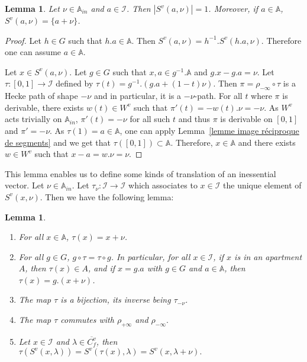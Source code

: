 \documentclass[12pt]{article}
\theoremstyle{plain}
\newtheorem{lemma}[theorem]{Lemma}
\theoremstyle{definition}
\newcommand{\A}{\mathbb{A}}
\newcommand{\I}{\mathcal{I}}
\begin{document}
\begin{lemma}\label{lemme partie inessentielle}
 Let $\nu\in\A_{in}$ and $a\in \I$. Then $|S^v(a,\nu)|=1$. Moreover, if $a\in \A$, $S^v(a,\nu)=\{a+\nu\}$. 

\end{lemma} 

\begin{proof} Let $h\in G$ such that $h.a\in \A$. Then $S^v(a,\nu)=h^{-1}.S^v(h.a,\nu)$. Therefore one can assume $a\in \A$. 

Let $x\in S^v(a,\nu)$. Let $g\in G$ such that $x,a\in g^{-1}.\A$ and $g.x-g.a=\nu$. Let $\tau:[0,1]\rightarrow \I$ defined by $\tau(t)=g^{-1}.(g.a+(1-t)\nu)$. Then $\pi=\rho_{-\infty}\circ \tau$ is a Hecke path of shape $-\nu$ and in particular,  it is a $-\nu$-path. For all $t$ where $\pi$ is derivable, there exists $w(t)\in W^v$ such that $\pi'(t)=-w(t).\nu=-\nu$. As $W^v$ acts trivially on $\A_{in}$, $\pi'(t)=-\nu$ for all such $t$ and thus $\pi$ is derivable on $[0,1]$ and $\pi'=-\nu$. As $\tau(1)=a\in \A$, one can apply Lemma~\ref{lemme image réciproque de segments} and we get that $\tau([0,1])\subset \A$. Therefore, $x\in \A$ and there exists $w\in W^v$ such that $x-a=w.\nu=\nu$.  
\end{proof}

\medskip

This lemma enables us to define some kinds of translation of an inessential vector. Let $\nu\in \A_{in}$. Let $\tau_\nu:\I\rightarrow \I$ which associates to $x\in \I$ the unique element of $S^v(x,\nu)$. Then we have the following lemma: 

\begin{lemma}\label{lemme propriétés des translations}
\begin{enumerate}
Let $\nu\in \A_{in}$ and $\tau=\tau_\nu$. Then:

\item For all $x\in \A$, $\tau(x)=x+\nu$.\label{item tau restreint à A}

\item For all $g\in G$, $g\circ\tau=\tau\circ g$. In particular, for all $x\in \I$, if $x$ is in an apartment $A$,
 then $\tau(x)\in A$, and if $x=g.a$ with $g\in G$ and $a\in\A$, then $\tau(x)=g.(x+\nu)$.\label{item commutation de tau}

\item The map $\tau$ is a bijection, its inverse being $\tau_{-\nu}$.\label{item bijectivité des translations}


\item The map $\tau$ commutes with $\rho_{+\infty}$ and $\rho_{-\infty}.$\label{item commutation translation retraction}

\item Let $x\in \I$ and $\lambda\in \overline{C_f^v}$, then $\tau(S^v(x,\lambda))=S^v(\tau(x),\lambda)=S^v(x,\lambda+\nu).$\label{item translation d'une boule}

\end{enumerate}
\end{lemma}
\end{document}
